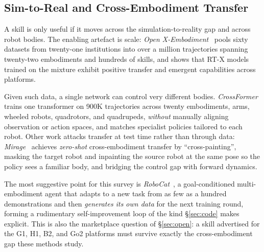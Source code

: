 \subsection{Sim-to-Real and Cross-Embodiment Transfer}
\label{sec:transfer}

A skill is only useful if it moves across the simulation-to-reality gap and across robot
bodies. The enabling artefact is scale: \emph{Open X-Embodiment}~\citep{openx} pools sixty
datasets from twenty-one institutions into over a million trajectories spanning twenty-two
embodiments and hundreds of skills, and shows that RT-X models trained on the mixture exhibit
positive transfer and emergent capabilities across platforms.

Given such data, a single network can control very different bodies.
\emph{CrossFormer}~\citep{crossformer} trains one transformer on 900K trajectories across
twenty embodiments, arms, wheeled robots, quadrotors, and quadrupeds, \emph{without} manually
aligning observation or action spaces, and matches specialist policies tailored to each robot.
Other work attacks transfer at test time rather than through data:
\emph{Mirage}~\citep{mirage} achieves \emph{zero-shot} cross-embodiment transfer by
``cross-painting'', masking the target robot and inpainting the source robot at the same pose
so the policy sees a familiar body, and bridging the control gap with forward dynamics.

The most suggestive point for this survey is \emph{RoboCat}~\citep{robocat}, a goal-conditioned
multi-embodiment agent that adapts to a new task from as few as a hundred demonstrations and
then \emph{generates its own data} for the next training round, forming a rudimentary
self-improvement loop of the kind \S\ref{sec:code} makes explicit. This is also the marketplace
question of \S\ref{sec:open}: a skill advertised for the G1, H1, B2, and Go2
platforms must survive exactly the cross-embodiment gap these methods study.
